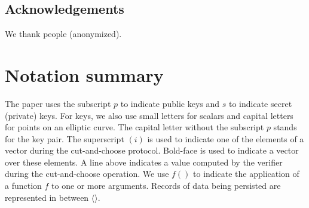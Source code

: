 \documentclass[sigconf, authordraft]{acmart}
\begin{document}
\subsection*{Acknowledgements}

We thank people (anonymized).
\newpage






\newpage
\appendix

\section{Notation summary}

The paper uses the subscript $p$ to indicate public keys and $s$ to
indicate secret (private) keys.  For keys, we also use small letters
for scalars and capital letters for points on an elliptic curve.  The
capital letter without the subscript $p$ stands for the key pair.  The
superscript $(i)$ is used to indicate one of the elements of a vector
during the cut-and-choose protocol.  Bold-face is used to indicate a
vector over these elements.  A line above indicates a value computed
by the verifier during the cut-and-choose operation.  We use $f()$ to
indicate the application of a function $f$ to one or more arguments. Records of
data being persisted are represented in between $\langle\rangle$.
\end{document}
